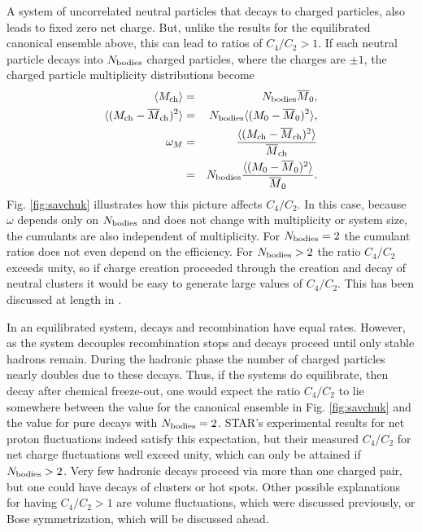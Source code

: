 A system of uncorrelated neutral particles that decays to charged particles, also leads to fixed zero net charge. But, unlike the results for the equilibrated canonical ensemble above, this can lead to ratios of $C_4/C_2>1$. If each neutral particle decays into $N_{\rm bodies}$ charged particles, where the charges are $\pm 1$, the charged particle multiplicity distributions become 
\begin{eqnarray}
\langle M_{\rm ch}\rangle&=&N_{\rm bodies}\overline{M}_0,\\
\nonumber
\langle(M_{\rm ch}-\overline{M}_{\rm ch})^2\rangle&=&N_{\rm bodies}\langle(M_0-\overline{M}_0)^2\rangle,\\
\nonumber
\omega_M&=&\frac{\langle(M_{\rm ch}-\overline{M}_{\rm ch})^2\rangle}{\overline{M}_{\rm ch}}\\
\nonumber
&=&N_{\rm bodies}\frac{\langle(M_0-\overline{M}_0)^2\rangle}{\overline{M}_0}.
\end{eqnarray}
Fig. \ref{fig:savchuk} illustrates how this picture affects $C_4/C_2$. In this case, because $\omega$ depends only on $N_{\rm bodies}$ and does not change with multiplicity or system size, the cumulants are also independent of multiplicity. For $N_{\rm bodies}=2$ the cumulant ratios does not even depend on the efficiency. For $N_{\rm bodies}>2$ the ratio $C_4/C_2$ exceeds unity, so if charge creation proceeded through the creation and decay of neutral clusters it would be easy to generate large values of $C_4/C_2$. This has been discussed at length in \cite{Bzdak:2018uhv}.

In an equilibrated system, decays and recombination have equal rates. However, as the system decouples recombination stops and decays proceed until only stable hadrons remain. During the hadronic phase the number of charged particles nearly doubles due to these decays. Thus, if the systems do equilibrate, then decay after chemical freeze-out, one would expect the ratio $C_4/C_2$ to lie somewhere between the value for the canonical ensemble in Fig. \ref{fig:savchuk} and the value for pure decays with $N_{\rm bodies}=2$. STAR's experimental results for net proton fluctuations indeed satisfy this expectation, but their measured $C_4/C_2$ for net charge fluctuations well exceed unity, which can only be attained if $N_{\rm bodies}>2$. Very few hadronic decays proceed via more than one charged pair, but one could have decays of clusters or hot spots. Other possible explanations for having $C_4/C_2>1$ are volume fluctuations, which were discussed previously, or Bose symmetrization, which will be discussed ahead.

